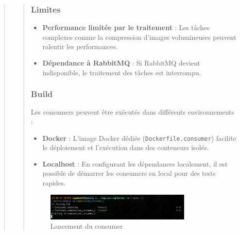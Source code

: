 \documentclass[12pt]{article}
\begin{document}
\begin{quote}
\begin{quote}
\subsubsection*{Limites}
\begin{itemize}
    \item \textbf{Performance limitée par le traitement} : Les tâches complexes comme la compression d'images volumineuses peuvent ralentir les performances.
    \item \textbf{Dépendance à RabbitMQ} : Si RabbitMQ devient indisponible, le traitement des tâches est interrompu.
\end{itemize}

\subsubsection*{Build}
Les consumers peuvent être exécutés dans différents environnements :
\begin{itemize}
    \item \textbf{Docker} : L'image Docker dédiée (\texttt{Dockerfile.consumer}) facilite le déploiement et l'exécution dans des conteneurs isolés.
    \item \textbf{Localhost} : En configurant les dépendances localement, il est possible de démarrer les consumers en local pour des tests rapides.
\end{itemize}
\begin{figure}[h!]
    \centering
    \includegraphics[width=0.8\textwidth]{compression_consumer.png}
    \caption{Lancement du consumer}
    \label{fig:rabbitmq}
\end{figure}
\end{quote}


\end{quote}

\end{document}
